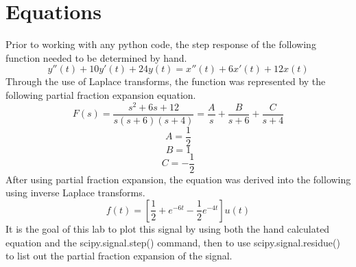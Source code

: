 \documentclass[12pt]{report}
\begin{document}
\section{Equations}
\hspace{\parindent}Prior to working with any python code, the step response of the following function needed to be determined by hand.
\[y''(t)+10y'(t)+24y(t) = x''(t) + 6x'(t) +12x(t)\]
Through the use of Laplace transforms, the function was represented by the following partial fraction expansion equation.
\[F(s) = \frac{s^2+6s+12}{s(s+6)(s+4)} = \frac{A}{s} + \frac{B}{s+6}+\frac{C}{s+4}\]
\[A = \frac{1}{2}\]
\[B = 1\]
\[C = -\frac{1}{2}\]
After using partial fraction expansion, the equation was derived into the following using inverse Laplace transforms.
\[f(t) = [\frac{1}{2} + e^{-6t}-\frac{1}{2}e^{-4t}]u(t)\]
It is the goal of this lab to plot this signal by using both the hand calculated equation and the scipy.signal.step() command, then to use scipy.signal.residue() to list out the partial fraction expansion of the signal.
\end{document}
